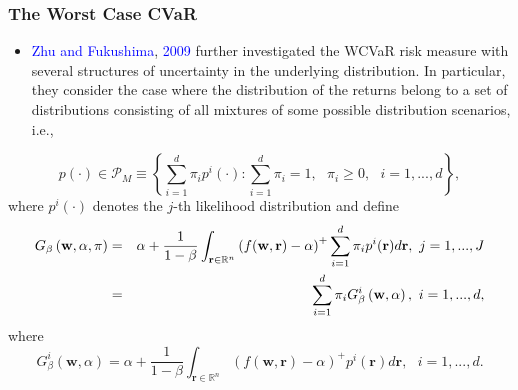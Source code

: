 \documentclass[pdf,9pt,xcolor=dvipsnames,hide notes]{beamer}
\begin{document}
\begin{frame}[label=frame2e]
	\frametitle{The Worst Case CVaR}
	
	\begin{itemize}
		\justifying
		
		\item \textcolor{blue}{Zhu and Fukushima}, \textcolor{blue}{2009} further investigated the WCVaR risk measure with
		several structures of uncertainty in the underlying distribution. In
		particular, they consider the case where the distribution
		of the returns belong to a set of distributions consisting of all mixtures of some
		possible distribution scenarios, i.e.,
		
	\end{itemize}
	
\begin{equation}
p\left( \cdot \right) \in \mathcal{P}_{M}\equiv \left\{ \sum_{i=1}^{d}\pi
_{i}p^{i}\left( \cdot \right) :\sum_{i=1}^{d}\pi _{i}=1,\text{ }\pi _{i}\geq
0,\text{ }i=1,...,d\right\} ,  \label{15}
\end{equation}%
where $p^{i}\left( \cdot \right) $ denotes the $j$-th likelihood
distribution and define
\begin{eqnarray}
G_{\beta }\left( \mathbf{w},\alpha ,\pi \right) &=&\alpha +\frac{1}{1-\beta }%
\int_{\mathbf{r}\in
	\mathbb{R}
	^{n}}\left( f(\mathbf{w},\mathbf{r})-\alpha \right) ^{+}\sum_{i=1}^{d}\pi
_{i}p^{i}(\mathbf{r})d\mathbf{r},\text{ }j=1,...,J  \notag \\
&=&\sum_{i=1}^{d}\pi _{i}G_{\beta }^{i}\left( \mathbf{w},\alpha \right) ,%
\text{ }i=1,...,d,  \label{16}
\end{eqnarray}%
where%
\begin{equation}
G_{\beta }^{i}\left( \mathbf{w},\alpha \right) =\alpha +\frac{1}{1-\beta }%
\int_{\mathbf{r}\in
	\mathbb{R}
	^{n}}\left( f(\mathbf{w},\mathbf{r})-\alpha \right) ^{+}p^{i}(\mathbf{r})d%
\mathbf{r},\text{ }i=1,...,d.  \label{17}
\end{equation}%
	
\end{frame}
\end{document}
